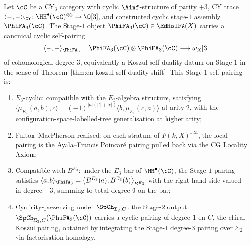 \begin{theorem}
\label{thm:stage-1-self-pairing-operadic}
Let $\cC$ be a CY$_3$ category with cyclic $\Ainf$-structure of parity
$+3$, CY trace
$\langle -, - \rangle_{\CY} \colon
\HH^\bullet(\cC)^{\otimes 2}\to\Q[3]$, and constructed cyclic
stage-$1$ assembly $\PhiFA_3(\cC)$. The Stage-$1$ object
$\PhiFA_3(\cC) \in \EdHolFA(X)$
carries a canonical cyclic self-pairing
\[
 \langle -, - \rangle_{\PhiFA_3}
 \;\colon\;
 \PhiFA_3(\cC) \otimes \PhiFA_3(\cC) \longrightarrow \omega_X[3]
\]
of cohomological degree $3$, equivalently a Koszul self-duality datum
on Stage-$1$ in the sense of
Theorem~\ref{thm:en-koszul-self-duality-shift}. This Stage-$1$
self-pairing is:
\begin{enumerate}[label=\textup{(\roman*)}]
 \item $E_3$-cyclic: compatible with the $E_3$-algebra structure,
 satisfying
 $\langle \mu_{E_3}(a, b), c \rangle = (-1)^{|a|(|b|+|c|)} \langle b, \mu_{E_3}(c, a) \rangle$
 at arity $2$, with the configuration-space-labelled-tree
 generalisation at higher arity;
 \item Fulton--MacPherson realised: on each stratum of
 $\overline{F}(k, X)^{\mathrm{FM}}$, the local pairing is the
 Ayala--Francis Poincar\'e pairing pulled back via the CG
 Locality Axiom;
 \item Compatible with $B^{E_3}$: under the $E_3$-bar of
 $\HH^\bullet(\cC)$, the Stage-$1$ pairing satisfies
 $\langle a, b \rangle_{\PhiFA_3} = \bigl\langle B^{E_3}(a), B^{E_3}(b) \bigr\rangle_{B^{E_3}}$
 with the right-hand side valued in degree $-3$, summing to
 total degree $0$ on the bar;
 \item Cyclicity-preserving under $\SpCh_{\Sigma_2, C}$: the
 Stage-$2$ output $\SpCh_{\Sigma_2, C}(\PhiFA_3(\cC))$ carries a
 cyclic pairing of degree $1$ on $C$, the chiral Koszul
 pairing, obtained by integrating the Stage-$1$ degree-$3$
 pairing over $\Sigma_2$ via factorisation homology.
\end{enumerate}
\end{theorem}

